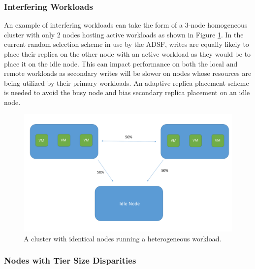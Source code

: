 \documentclass[12pt]{article}
\begin{document}
    \subsubsection{Interfering Workloads}

    An example of interfering workloads can take the form of a 3-node
    homogeneous cluster with only 2 nodes hosting active workloads as shown in
    Figure \ref{fig:workload_disparity}. In the current random selection scheme
    in use by the ADSF, writes are equally likely to place their replica on the
    other node with an active workload as they would be to place it on the idle
    node. This can impact performance on both the local and remote workloads as
    secondary writes will be slower on nodes whose resources are being utilized
    by their primary workloads. An adaptive replica placement scheme is needed
    to avoid the busy node and bias secondary replica placement on an idle
    node. 

    \begin{figure}[h]
      \centering
      \includegraphics[scale=0.45]{images/homogeneous_workload_disparity.pdf} 
      \caption{A cluster with identical nodes running a heterogeneous workload.}
      \label{fig:workload_disparity}
    \end{figure}

    \subsubsection{Nodes with Tier Size Disparities}
\end{document}
